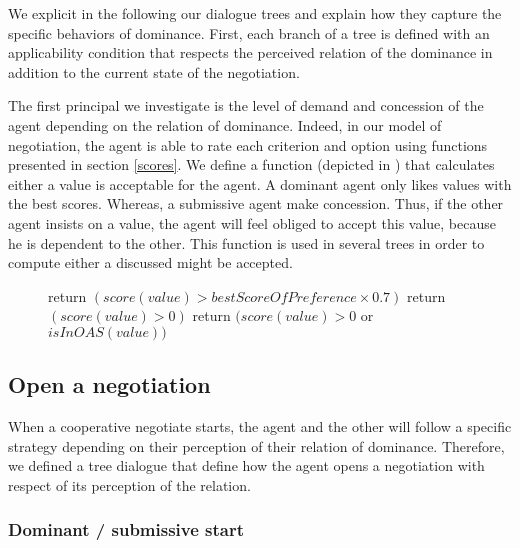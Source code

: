 \documentclass{llncs}
\begin{document}
\par We explicit in the following our dialogue trees and explain how they capture the specific behaviors of dominance. First, each branch of a tree  is defined with an applicability condition that respects the perceived relation of the dominance in addition to the current state of the negotiation. 

\par The first principal we investigate is the level of demand and concession of the agent depending on the relation of dominance. Indeed, in our model of negotiation, the agent is able to rate each criterion and option using functions presented in section \ref{scores}. We define a function (depicted in ) that calculates either a value is acceptable for the agent. A dominant agent only likes values with the best scores. Whereas, a submissive agent make concession. Thus, if the other agent insists on a value, the agent will feel obliged to accept this value, because he is dependent to the other. This function is used in several trees in order to compute either a discussed might be accepted.

 	\begin{figure}[]
 		\begin{algorithmic}[1]\small
 			
 			\State return $(score(value)> bestScoreOfPreference \times 0.7)$
 			\EndIf
 			\State return $(score(value)> 0)$
 			\EndIf
 			\State return $(score(value)> 0$  or $isInOAS(value))$
 			\EndIf
 			\EndFunction
 		\end{algorithmic}
 		\vskip 8pt
 	\end{figure} 
\subsection{Open a negotiation}
When a cooperative negotiate starts, the agent and the other will follow a specific strategy depending on their perception of their relation of dominance. Therefore, we defined a tree dialogue that define how the agent opens a negotiation with respect of its perception of the relation.
\subsubsection{Dominant / submissive start}
\end{document}
